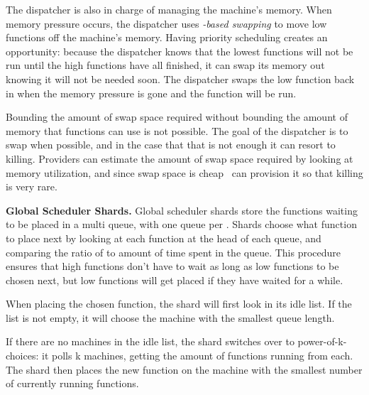 The dispatcher is also in charge of managing the machine's memory. When memory
pressure occurs, the dispatcher uses \textit{\class{}-based swapping} to move
low \class{} functions off the machine's memory. Having priority scheduling
creates an opportunity: because the dispatcher knows that the lowest \class{}
functions will not be run until the high \class{} functions have all finished,
it can swap its memory out knowing it will not be needed soon. The dispatcher
swaps the low \class{} function back in when the memory pressure is gone and the
function will be run.

Bounding the amount of swap space required without bounding the amount of memory
that functions can use is not possible. The goal of the dispatcher is to swap
when possible, and in the case that that is not enough it can resort to killing.
Providers can estimate the amount of swap space required by looking at memory
utilization, and since swap space is cheap~\cite{ssd-price} can provision it so
that killing is very rare.

\textbf{Global Scheduler Shards.}
Global scheduler shards store the functions waiting to be placed in a multi
queue, with one queue per \priceclass{}. Shards choose what function to place
next by looking at each function at the head of each queue, and comparing the
ratio of \class{} to amount of time spent in the queue. This procedure ensures
that high \class{} functions don't have to wait as long as low \class{}
functions to be chosen next, but low \class{} functions will get placed if they
have waited for a while.

When placing the chosen function, the shard will first look in its idle list. If
the list is not empty, it will choose the machine with the smallest queue
length.

If there are no machines in the idle list, the shard switches over to
power-of-k-choices: it polls k machines, getting the amount of functions running
from each. The shard then places the new function on the machine with the
smallest number of currently running functions. 
